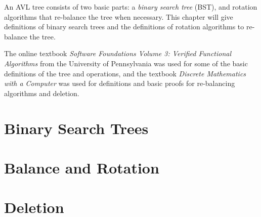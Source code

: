 An AVL tree consists of two basic parts: a \textit{binary search tree} (BST), and rotation algorithms that re-balance the tree when necessary.
This chapter will give definitions of binary search trees and the definitions of rotation algorithms to re-balance the tree.

The online textbook \textit{Software Foundations Volume 3: Verified Functional Algorithms} \cite{bst:upenn} from the University of Pennsylvania was used for some of the basic definitions 
of the tree and operations, and the textbook \textit{Discrete Mathematics with a Computer} \cite{avl:computer} was used for definitions and basic proofs for re-balancing algorithms and deletion.

\section{Binary Search Trees}


\section{Balance and Rotation}


\section{Deletion}
